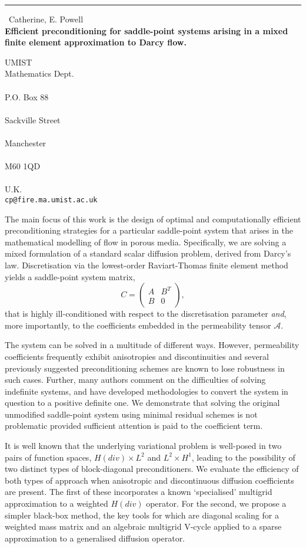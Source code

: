 \documentclass{report}
\begin{document}
\begin{center}
\rule{6in}{1pt} \
{\large Catherine, E. Powell \\
{\bf Efficient preconditioning for saddle-point systems arising in a mixed finite element approximation to Darcy flow.}}

UMIST \\ Mathematics Dept. \\ \\ P.O. Box 88 \\ \\ Sackville Street \\ \\ Manchester \\ \\ M60 1QD \\ \\ U.K.
\\
{\tt cp@fire.ma.umist.ac.uk}\end{center}

The main focus of this work is the design of optimal and
computationally efficient preconditioning strategies for a particular
saddle-point system that arises in the mathematical modelling of flow in
porous media. Specifically, we are solving a mixed formulation of a
standard scalar diffusion problem, derived from Darcy's law.
Discretisation via the lowest-order Raviart-Thomas finite element method
yields a saddle-point system matrix,
$$ C = \left(\begin{array}{cc} A & B^{T} \\ B & 0
\end{array}\right),$$
\noindent that is highly ill-conditioned with respect to the
discretisation parameter \textit{and}, more importantly, to the
coefficients embedded in the permeability tensor $\mathcal{A}.$

The system can be solved in a multitude of different ways. However,
permeability coefficients frequently exhibit anisotropies and
discontinuities and several previously suggested preconditioning schemes
are known to lose robustness in such cases. Further, many authors comment
on the difficulties of solving indefinite systems, and have developed
methodologies to convert the system in question to a positive definite
one. We demonstrate that solving the original unmodified saddle-point
system using minimal residual schemes is not problematic provided
sufficient attention is paid to the coefficient term.

It is well known that the underlying variational problem is well-posed in
two pairs of function spaces, $H(div)\times L^{2}$ and $L^{2} \times
H^{1}$, leading to the possibility of two distinct types of
block-diagonal preconditioners. We evaluate the efficiency of both types
of approach when anisotropic and discontinuous diffusion coefficients are
present. The
first of these incorporates a known `specialised' multigrid approximation
to a weighted $H(div)$ operator. For the second, we propose a simpler
black-box method, the key tools for which are diagonal scaling for a
weighted mass matrix and an algebraic multigrid V-cycle applied to a
sparse approximation to a generalised diffusion operator.
\end{document}
